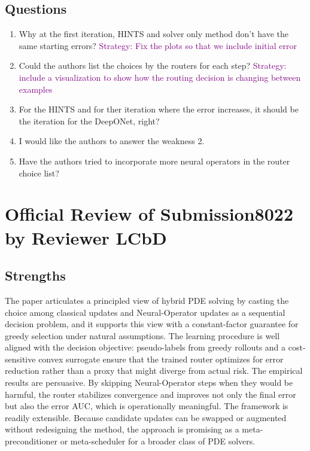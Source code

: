 \documentclass[12pt]{article}
\begin{document}
\subsection*{Questions}
\begin{enumerate}
    \item Why at the first iteration, HINTS and solver only method don’t have the same starting errors? \textcolor{purple}{Strategy: Fix the plots so that we include initial error}
    \item Could the authors list the choices by the routers for each step? \textcolor{purple}{Strategy: include a visualization to show how the routing decision is changing between examples}
    \item For the HINTS and for ther iteration where the error increases, it should be the iteration for the DeepONet, right?
    \item I would like the authors to answer the weakness 2.
    \item Have the authors tried to incorporate more neural operators in the router choice list?
\end{enumerate}

\section{Official Review of Submission8022 by Reviewer LCbD}

\subsection*{Strengths}

The paper articulates a principled view of hybrid PDE solving by casting the choice among classical updates and Neural-Operator updates as a sequential decision problem, and it supports this view with a constant-factor guarantee for greedy selection under natural assumptions. The learning procedure is well aligned with the decision objective: pseudo-labels from greedy rollouts and a cost-sensitive convex surrogate ensure that the trained router optimizes for error reduction rather than a proxy that might diverge from actual risk. The empirical results are persuasive. By skipping Neural-Operator steps when they would be harmful, the router stabilizes convergence and improves not only the final error but also the error AUC, which is operationally meaningful. The framework is readily extensible. Because candidate updates can be swapped or augmented without redesigning the method, the approach is promising as a meta-preconditioner or meta-scheduler for a broader class of PDE solvers.
\end{document}
